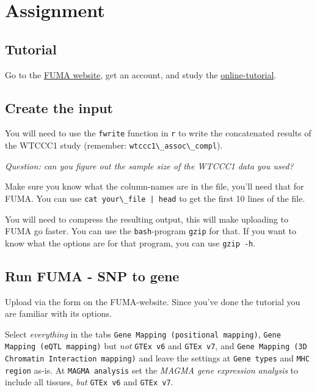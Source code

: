 \documentclass[
]{book}
\newcommand{\passthrough}[1]{#1}
\begin{document}
\hypertarget{assignment-1}{%
\section{Assignment}\label{assignment-1}}

\hypertarget{tutorial}{%
\subsection{Tutorial}\label{tutorial}}

Go to the \href{https://fuma.ctglab.nl}{FUMA website}, get an account, and study the \href{https://fuma.ctglab.nl/tutorial}{online-tutorial}.

\hypertarget{create-the-input}{%
\subsection{Create the input}\label{create-the-input}}

You will need to use the \passthrough{\lstinline!fwrite!} function in \passthrough{\lstinline!r!} to write the concatenated results of the WTCCC1 study (remember: \passthrough{\lstinline!wtccc1\_assoc\_compl!}).

\emph{Question: can you figure out the sample size of the WTCCC1 data you used?}

Make sure you know what the column-names are in the file, you'll need that for FUMA. You can use \passthrough{\lstinline!cat your\_file | head!} to get the first 10 lines of the file.

You will need to compress the resulting output, this will make uploading to FUMA go faster. You can use the \passthrough{\lstinline!bash!}-program \passthrough{\lstinline!gzip!} for that. If you want to know what the options are for that program, you can use \passthrough{\lstinline!gzip -h!}.

\hypertarget{run-fuma---snp-to-gene}{%
\subsection{Run FUMA - SNP to gene}\label{run-fuma---snp-to-gene}}

Upload via the form on the FUMA-website. Since you've done the tutorial you are familiar with its options.

Select \emph{everything} in the tabs \passthrough{\lstinline!Gene Mapping (positional mapping)!}, \passthrough{\lstinline!Gene Mapping (eQTL mapping)!} but \emph{not} \passthrough{\lstinline!GTEx v6!} and \passthrough{\lstinline!GTEx v7!}, and \passthrough{\lstinline!Gene Mapping (3D Chromatin Interaction mapping)!} and leave the settings at \passthrough{\lstinline!Gene types!} and \passthrough{\lstinline!MHC region!} as-is. At \passthrough{\lstinline!MAGMA analysis!} set the \emph{MAGMA gene expression analysis} to include all tissues, \emph{but} \passthrough{\lstinline!GTEx v6!} and \passthrough{\lstinline!GTEx v7!}.
\end{document}
